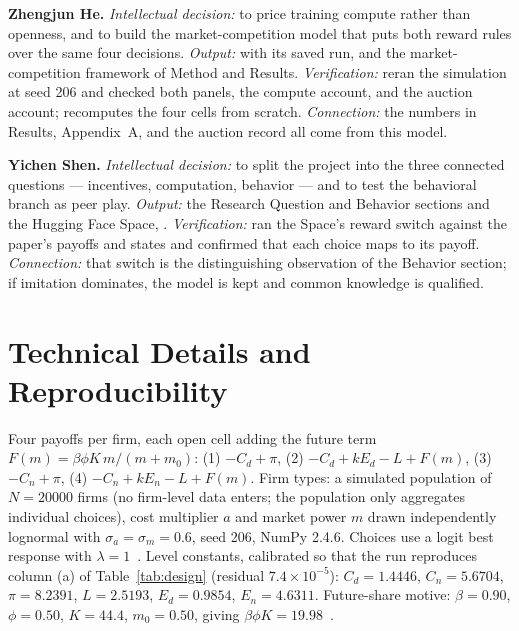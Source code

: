 \noindent\textbf{Zhengjun He.} \emph{Intellectual decision:} to price training compute rather than openness, and to build the market-competition model that puts both reward rules over the same four decisions. \emph{Output:}  with its saved run, and the market-competition framework of Method and Results. \emph{Verification:} reran the simulation at seed 206 and checked both panels, the compute account, and the auction account;  recomputes the four cells from scratch. \emph{Connection:} the numbers in Results, Appendix~A, and the auction record all come from this model.

\noindent\textbf{Yichen Shen.} \emph{Intellectual decision:} to split the project into the three connected questions --- incentives, computation, behavior --- and to test the behavioral branch as peer play. \emph{Output:} the Research Question and Behavior sections and the Hugging Face Space, \HuggingFaceLink. \emph{Verification:} ran the Space's reward switch against the paper's payoffs and states and confirmed that each choice maps to its payoff. \emph{Connection:} that switch is the distinguishing observation of the Behavior section; if imitation dominates, the model is kept and common knowledge is qualified.


\appendix
\section{Technical Details and Reproducibility}
Four payoffs per firm, each open cell adding the future term $F(m)=\beta\phi K\,m/(m+m_0)$: (1) $-C_d+\pi$, (2) $-C_d+kE_d-L+F(m)$, (3) $-C_n+\pi$, (4) $-C_n+kE_n-L+F(m)$. Firm types: a simulated population of $N=20000$ firms (no firm-level data enters; the population only aggregates individual choices), cost multiplier $a$ and market power $m$ drawn independently lognormal with $\sigma_a=\sigma_m=0.6$, seed 206, NumPy 2.4.6. Choices use a logit best response with $\lambda=1$~\cite{mckelvey1995}. Level constants, calibrated so that the run reproduces column (a) of Table~\ref{tab:design} (residual $7.4\times10^{-5}$): $C_d=1.4446$, $C_n=5.6704$, $\pi=8.2391$, $L=2.5193$, $E_d=0.9854$, $E_n=4.6311$. Future-share motive: $\beta=0.90$, $\phi=0.50$, $K=44.4$, $m_0=0.50$, giving $\beta\phi K=19.98$~\cite{habibi2025}.

